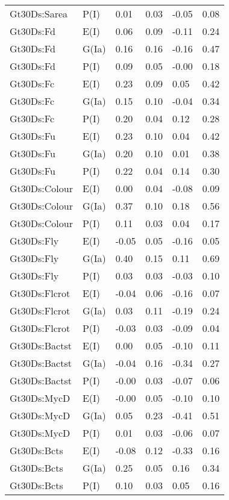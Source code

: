 \begin{center}
\begin{longtable}{|p{1.1in}|p{0.7in}|p{0.7in}|p{0.6in}|p{0.6in}|p{0.6in}|}
  Gt30Ds:Sarea & P(I) & 0.01 & 0.03 & -0.05 & 0.08 \\ 
  Gt30Ds:Fd & E(I) & 0.06 & 0.09 & -0.11 & 0.24 \\ 
  Gt30Ds:Fd & G(Ia) & 0.16 & 0.16 & -0.16 & 0.47 \\ 
  Gt30Ds:Fd & P(I) & 0.09 & 0.05 & -0.00 & 0.18 \\ 
  Gt30Ds:Fc & E(I) & 0.23 & 0.09 & 0.05 & 0.42 \\ 
  Gt30Ds:Fc & G(Ia) & 0.15 & 0.10 & -0.04 & 0.34 \\ 
  Gt30Ds:Fc & P(I) & 0.20 & 0.04 & 0.12 & 0.28 \\ 
  Gt30Ds:Fu & E(I) & 0.23 & 0.10 & 0.04 & 0.42 \\ 
  Gt30Ds:Fu & G(Ia) & 0.20 & 0.10 & 0.01 & 0.38 \\ 
  Gt30Ds:Fu & P(I) & 0.22 & 0.04 & 0.14 & 0.30 \\ 
  Gt30Ds:Colour & E(I) & 0.00 & 0.04 & -0.08 & 0.09 \\ 
  Gt30Ds:Colour & G(Ia) & 0.37 & 0.10 & 0.18 & 0.56 \\ 
  Gt30Ds:Colour & P(I) & 0.11 & 0.03 & 0.04 & 0.17 \\ 
  Gt30Ds:Fly & E(I) & -0.05 & 0.05 & -0.16 & 0.05 \\ 
  Gt30Ds:Fly & G(Ia) & 0.40 & 0.15 & 0.11 & 0.69 \\ 
  Gt30Ds:Fly & P(I) & 0.03 & 0.03 & -0.03 & 0.10 \\ 
  Gt30Ds:Flcrot & E(I) & -0.04 & 0.06 & -0.16 & 0.07 \\ 
  Gt30Ds:Flcrot & G(Ia) & 0.03 & 0.11 & -0.19 & 0.24 \\ 
  Gt30Ds:Flcrot & P(I) & -0.03 & 0.03 & -0.09 & 0.04 \\ 
  Gt30Ds:Bactst & E(I) & 0.00 & 0.05 & -0.10 & 0.11 \\ 
  Gt30Ds:Bactst & G(Ia) & -0.04 & 0.16 & -0.34 & 0.27 \\ 
  Gt30Ds:Bactst & P(I) & -0.00 & 0.03 & -0.07 & 0.06 \\ 
  Gt30Ds:MycD & E(I) & -0.00 & 0.05 & -0.10 & 0.10 \\ 
  Gt30Ds:MycD & G(Ia) & 0.05 & 0.23 & -0.41 & 0.51 \\ 
  Gt30Ds:MycD & P(I) & 0.01 & 0.03 & -0.06 & 0.07 \\ 
  Gt30Ds:Bcts & E(I) & -0.08 & 0.12 & -0.33 & 0.16 \\ 
  Gt30Ds:Bcts & G(Ia) & 0.25 & 0.05 & 0.16 & 0.34 \\ 
  Gt30Ds:Bcts & P(I) & 0.10 & 0.03 & 0.05 & 0.16 \\ 

\end{longtable}
\end{center}
